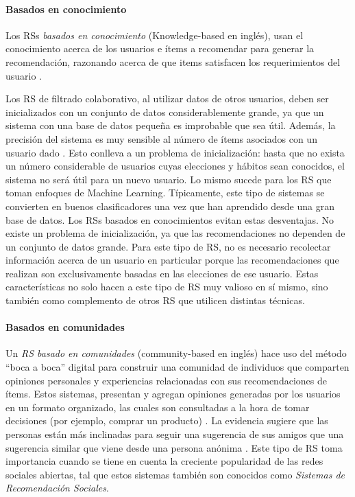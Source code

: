 \paragraph{Basados en conocimiento}
Los RSs \textit{basados en conocimiento} (Knowledge-based en inglés), usan el conocimiento acerca de los usuarios e ítems a recomendar para generar la recomendación, razonando acerca de que items satisfacen los requerimientos del usuario \citep{burke2000knowledge}.

\bigskip Los RS de filtrado colaborativo, al utilizar datos de otros usuarios, deben ser inicializados con un conjunto de datos considerablemente grande, ya que un sistema con una base de datos pequeña es improbable que sea útil. Además, la precisión del sistema es muy sensible al número de ítems asociados con un usuario dado \citep{shardanand1995social}. Esto conlleva a un problema de inicialización: hasta que no exista un número considerable de usuarios cuyas elecciones y hábitos sean conocidos, el sistema no será útil para un nuevo usuario. Lo mismo sucede para los RS que toman enfoques de Machine Learning. Típicamente, este tipo de sistemas se convierten en buenos clasificadores una vez que han aprendido desde una gran base de datos. Los RSs basados en conocimientos evitan estas desventajas. No existe un problema de inicialización, ya que las recomendaciones no dependen de un conjunto de datos grande. Para este tipo de RS, no es necesario recolectar información acerca de un usuario en particular porque las recomendaciones que realizan son exclusivamente basadas en las elecciones de ese usuario. Estas características no solo hacen a este tipo de RS muy valioso en sí mismo, sino también como complemento de otros RS que utilicen distintas técnicas.

\paragraph{Basados en comunidades}
Un \textit{RS basado en comunidades} (community-based en inglés) hace uso del método “boca a boca” digital para construir una comunidad de individuos que comparten opiniones personales y experiencias relacionadas con sus recomendaciones de ítems. Estos sistemas, presentan y agregan opiniones generadas por los usuarios en un formato organizado, las cuales son consultadas a la hora de tomar decisiones (por ejemplo, comprar un producto) \citep{chen2009community}. La evidencia sugiere que las personas están más inclinadas para seguir una sugerencia de sus amigos que una sugerencia similar que viene desde una persona anónima \citep{sinha2001comparing}. Este tipo de RS toma importancia cuando se tiene en cuenta la creciente popularidad de las redes sociales abiertas, tal que estos sistemas también son conocidos como \textit{Sistemas de Recomendación Sociales}.

